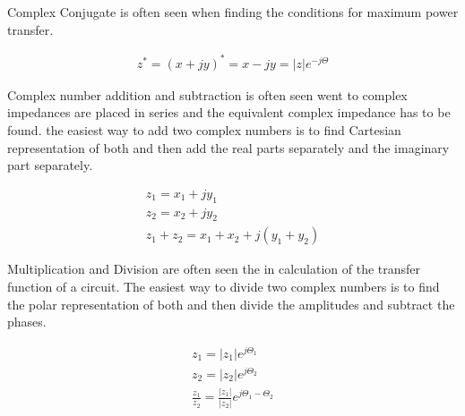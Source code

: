 \documentclass{ximera}
\begin{document}
 Complex Conjugate is often seen when finding the conditions for maximum power transfer.

\begin{eqnarray}
z^* = (x+ j y)^* = x- j y = |z| e^{-j \Theta}
\end{eqnarray}


 Complex number addition and subtraction is often seen went to complex impedances are placed in series and the equivalent  complex impedance has to be found. the easiest way to add two complex numbers is to find Cartesian representation of both and then add the real parts separately and the imaginary part separately.

\begin{eqnarray}
z_1=x_1 + j y_1 \\
z_2=x_2 + j y_2 \\
z_1+z_2 = x_1 + x_2 + j ( y_1 + y_2)
\end{eqnarray}

Multiplication and Division are often seen the in calculation of the transfer function of a circuit. The easiest way to divide two complex numbers is to find the polar representation of both and then divide the amplitudes  and subtract the phases.

\begin{eqnarray}
z_1=|z_1| e^{j \Theta_1} \\
z_2=|z_2| e^{j \Theta_2} \\
\frac{z_1}{ z_2} = \frac{|z_1|}{|z_2|} e^{j \Theta_1 -\Theta_2}
\end{eqnarray}
  


 
\end{document}
